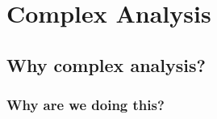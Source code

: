 \documentclass[
  11pt,
	colorful,
	raggedright,
]{tufte-style-thesis-flip}
\begin{document}



\part{Complex Analysis}

\chapter{Why complex analysis?}

\section{Why are we doing this?}
\end{document}
